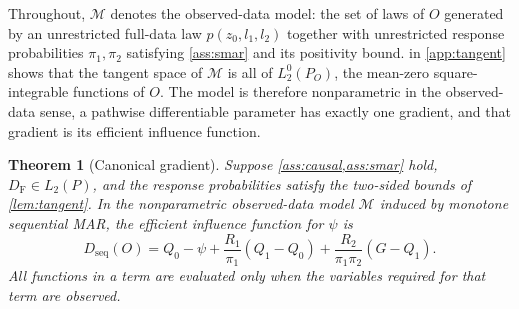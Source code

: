 \documentclass[11pt]{article}
\newtheorem{theorem}{Theorem}
\theoremstyle{definition}
\newcommand{\1}{\mathbf{1}}
\newcommand{\seq}{\mathrm{seq}}
\newcommand{\F}{\mathrm{F}}
\begin{document}
Throughout, $\mathcal M$ denotes the observed-data model: the set of laws of
$O$ generated by an unrestricted full-data law $p(z_0,l_1,l_2)$ together with
unrestricted response probabilities $\pi_1,\pi_2$ satisfying \cref{ass:smar}
and its positivity bound.  in \cref{app:tangent} shows that
the tangent space of $\mathcal M$ is all of $L_2^0(P_O)$, the mean-zero square-integrable
functions of $O$. The model is therefore nonparametric in the observed-data
sense, a pathwise differentiable parameter has exactly one gradient, and that
gradient is its efficient influence function.

\begin{theorem}[Canonical gradient]\label{thm:eif}
Suppose \cref{ass:causal,ass:smar} hold, $D_{\F}\in L_2(P)$, and the response
probabilities satisfy the two-sided bounds of \cref{lem:tangent}. In the
nonparametric observed-data model $\mathcal M$ induced by monotone sequential
MAR, the efficient influence function for $\psi$ is
\begin{equation}\label{eq:seq-eif}
\boxed{
D_{\seq}(O)=Q_0-\psi
+\frac{R_1}{\pi_1}(Q_1-Q_0)
+\frac{R_2}{\pi_1\pi_2}(G-Q_1).}
\end{equation}
All functions in a term are evaluated only when the variables required for that term are observed.
\end{theorem}
\end{document}
